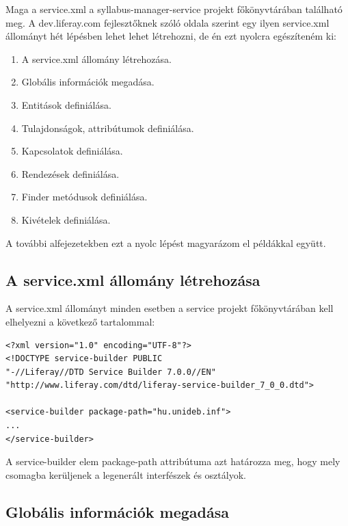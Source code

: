\documentclass[hidelinks, 12pt, a4paper]{report}
\begin{document}
Maga a service.xml a syllabus-manager-service projekt főkönyvtárában található meg. A dev.liferay.com fejlesztőknek szóló oldala szerint egy ilyen service.xml állományt hét lépésben lehet lehet létrehozni, de én ezt nyolcra egészíteném ki:
\begin{enumerate}
\item A service.xml állomány létrehozása.
\item Globális információk megadása.
\item Entitások definiálása.
\item Tulajdonságok, attribútumok definiálása.
\item Kapcsolatok definiálása.
\item Rendezések definiálása.
\item Finder metódusok definiálása.
\item Kivételek definiálása.
\end{enumerate}


A további alfejezetekben ezt a nyolc lépést magyarázom el példákkal együtt.

\subsection{A service.xml állomány létrehozása}

A service.xml állományt minden esetben a service projekt főkönyvtárában kell elhelyezni a következő tartalommal:

\begin{minipage}{\linewidth}
\begin{lstlisting}[basicstyle=\small]
<?xml version="1.0" encoding="UTF-8"?>
<!DOCTYPE service-builder PUBLIC
"-//Liferay//DTD Service Builder 7.0.0//EN"
"http://www.liferay.com/dtd/liferay-service-builder_7_0_0.dtd">

<service-builder package-path="hu.unideb.inf">
...
</service-builder>
\end{lstlisting}
\end{minipage}

A service-builder elem package-path attribútuma azt határozza meg, hogy mely csomagba kerüljenek a legenerált interfészek és osztályok.

\subsection{Globális információk megadása}
\end{document}
